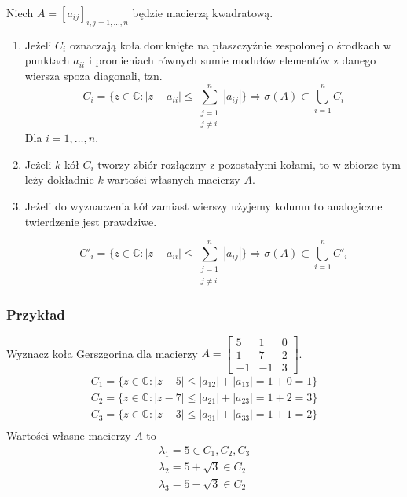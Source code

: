 \documentclass[../mn-notatki.tex]{subfiles}
\begin{document}
\begin{tcolorbox}
Niech $A = [a_{ij}]_{i,j = 1,\ldots, n}$ będzie macierzą kwadratową.
\begin{enumerate}
    \item Jeżeli $C_i$ oznaczają koła domknięte na płaszczyźnie zespolonej
    o środkach w punktach $a_{ii}$ i promieniach równych sumie modułów
    elementów z danego wiersza spoza diagonali, tzn.
    \[
    C_i = \{ z \in \mathbb{C} : |z - a_{ii}| \leqslant
    \sum_{\substack{j = 1\\ j \neq i}}^{n} |a_{ij}| \}
    \Longrightarrow
    \sigma(A) \subset \bigcup_{i=1}^n C_i
    \]
    Dla $i = 1, \ldots, n$.

    \item Jeżeli $k$ kół $C_i$ tworzy zbiór rozłączny z pozostałymi kołami,
    to w zbiorze tym leży dokładnie $k$ wartości własnych macierzy $A$.

    \item Jeżeli do wyznaczenia kół zamiast wierszy użyjemy kolumn to
    analogiczne twierdzenie jest prawdziwe.

    \[
    C'_i = \{ z \in \mathbb{C} : |z - a_{ii}| \leqslant
    \sum_{\substack{j = 1\\ j \neq i}}^{n} |a_{ij}| \}
    \Longrightarrow
    \sigma(A) \subset \bigcup_{i=1}^n C'_i
    \]
\end{enumerate}
\end{tcolorbox}

\subsubsection{Przykład}

Wyznacz koła Gerszgorina dla macierzy $A = \left[ \begin{smallmatrix}
5 & 1 & 0\\
1 & 7 & 2\\
-1 & -1 & 3
\end{smallmatrix} \right]$.
\begin{gather*}
C_1 = \{ z \in \mathbb{C} : |z - 5| \leqslant |a_{12}| + |a_{13}| = 1 + 0 = 1 \} \\
C_2 = \{ z \in \mathbb{C} : |z - 7| \leqslant |a_{21}| + |a_{23}| = 1 + 2 = 3 \} \\
C_3 = \{ z \in \mathbb{C} : |z - 3| \leqslant |a_{31}| + |a_{33}| = 1 + 1 = 2 \} \\
\end{gather*}
Wartości własne macierzy $A$ to
\begin{gather*}
\lambda_1 = 5 \in C_1, C_2, C_3\\
\lambda_2 = 5 + \sqrt{3} \in C_2\\
\lambda_3 = 5 - \sqrt{3} \in C_2\\
\end{gather*}


\pagebreak
\end{document}
